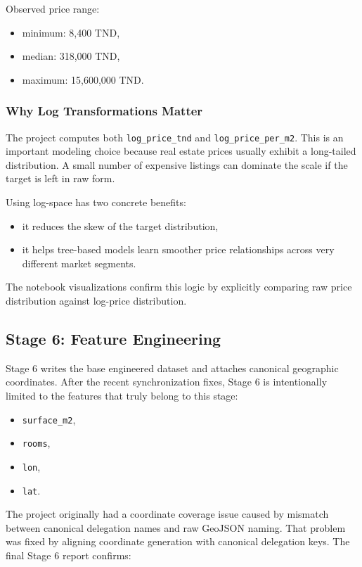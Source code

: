 \documentclass[11pt,a4paper]{article}
\newcommand{\code}[1]{\texttt{#1}}
\begin{document}
Observed price range:

\begin{itemize}
\item minimum: 8,400 TND,
\item median: 318,000 TND,
\item maximum: 15,600,000 TND.
\end{itemize}

\subsubsection{Why Log Transformations Matter}

The project computes both \code{log\_price\_tnd} and \code{log\_price\_per\_m2}. This is an important modeling choice because real estate prices usually exhibit a long-tailed distribution. A small number of expensive listings can dominate the scale if the target is left in raw form.

Using log-space has two concrete benefits:

\begin{itemize}
\item it reduces the skew of the target distribution,
\item it helps tree-based models learn smoother price relationships across very different market segments.
\end{itemize}

The notebook visualizations confirm this logic by explicitly comparing raw price distribution against log-price distribution.

\subsection{Stage 6: Feature Engineering}

Stage 6 writes the base engineered dataset and attaches canonical geographic coordinates. After the recent synchronization fixes, Stage 6 is intentionally limited to the features that truly belong to this stage:

\begin{itemize}
\item \code{surface\_m2},
\item \code{rooms},
\item \code{lon},
\item \code{lat}.
\end{itemize}

The project originally had a coordinate coverage issue caused by mismatch between canonical delegation names and raw GeoJSON naming. That problem was fixed by aligning coordinate generation with canonical delegation keys. The final Stage 6 report confirms:
\end{document}
